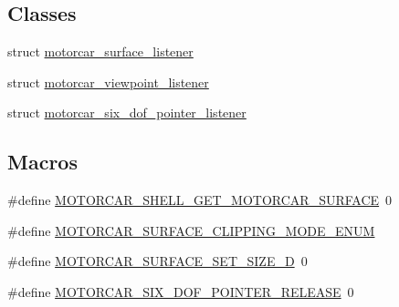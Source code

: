 \subsection*{Classes}
\begin{DoxyCompactItemize}
\item 
struct \hyperlink{structmotorcar__surface__listener}{motorcar\-\_\-surface\-\_\-listener}
\item 
struct \hyperlink{structmotorcar__viewpoint__listener}{motorcar\-\_\-viewpoint\-\_\-listener}
\item 
struct \hyperlink{structmotorcar__six__dof__pointer__listener}{motorcar\-\_\-six\-\_\-dof\-\_\-pointer\-\_\-listener}
\end{DoxyCompactItemize}
\subsection*{Macros}
\begin{DoxyCompactItemize}
\item 
\#define \hyperlink{motorcar-client-protocol_8h_a99bdc7c0bb1a6088577cfe9c263b33a4}{M\-O\-T\-O\-R\-C\-A\-R\-\_\-\-S\-H\-E\-L\-L\-\_\-\-G\-E\-T\-\_\-\-M\-O\-T\-O\-R\-C\-A\-R\-\_\-\-S\-U\-R\-F\-A\-C\-E}~0
\item 
\#define \hyperlink{motorcar-client-protocol_8h_a05c9db4a248e2261dd9c82c9cc7ba0c8}{M\-O\-T\-O\-R\-C\-A\-R\-\_\-\-S\-U\-R\-F\-A\-C\-E\-\_\-\-C\-L\-I\-P\-P\-I\-N\-G\-\_\-\-M\-O\-D\-E\-\_\-\-E\-N\-U\-M}
\item 
\#define \hyperlink{motorcar-client-protocol_8h_aa5b57df8265d060d778fba7a88e98c00}{M\-O\-T\-O\-R\-C\-A\-R\-\_\-\-S\-U\-R\-F\-A\-C\-E\-\_\-\-S\-E\-T\-\_\-\-S\-I\-Z\-E\-\_\-D}~0
\item 
\#define \hyperlink{motorcar-client-protocol_8h_ac153dc2355f97b3f07ab128e0cd75222}{M\-O\-T\-O\-R\-C\-A\-R\-\_\-\-S\-I\-X\-\_\-\-D\-O\-F\-\_\-\-P\-O\-I\-N\-T\-E\-R\-\_\-\-R\-E\-L\-E\-A\-S\-E}~0
\end{DoxyCompactItemize}
